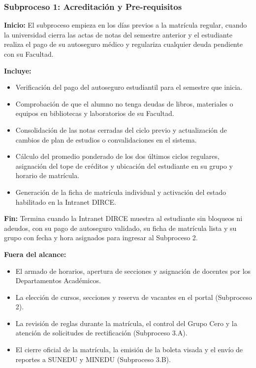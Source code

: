 \subsubsection{Subproceso 1: Acreditación y Pre-requisitos}

\textbf{Inicio:} El subproceso empieza en los días previos a la matrícula regular, cuando la universidad cierra las actas de notas del semestre anterior y el estudiante realiza el pago de su autoseguro médico y regulariza cualquier deuda pendiente con su Facultad.

\textbf{Incluye:}
\begin{itemize}
    \item Verificación del pago del autoseguro estudiantil para el semestre que inicia.
    \item Comprobación de que el alumno no tenga deudas de libros, materiales o equipos en bibliotecas y laboratorios de su Facultad.
    \item Consolidación de las notas cerradas del ciclo previo y actualización de cambios de plan de estudios o convalidaciones en el sistema.
    \item Cálculo del promedio ponderado de los dos últimos ciclos regulares, asignación del tope de créditos y ubicación del estudiante en su grupo y horario de matrícula.
    \item Generación de la ficha de matrícula individual y activación del estado habilitado en la Intranet DIRCE.
\end{itemize}

\textbf{Fin:} Termina cuando la Intranet DIRCE muestra al estudiante sin bloqueos ni adeudos, con su pago de autoseguro validado, su ficha de matrícula lista y su grupo con fecha y hora asignados para ingresar al Subproceso 2.

\textbf{Fuera del alcance:}
\begin{itemize}
    \item El armado de horarios, apertura de secciones y asignación de docentes por los Departamentos Académicos.
    \item La elección de cursos, secciones y reserva de vacantes en el portal (Subproceso 2).
    \item La revisión de reglas durante la matrícula, el control del Grupo Cero y la atención de solicitudes de rectificación (Subproceso 3.A).
    \item El cierre oficial de la matrícula, la emisión de la boleta visada y el envío de reportes a SUNEDU y MINEDU (Subproceso 3.B).
\end{itemize}
